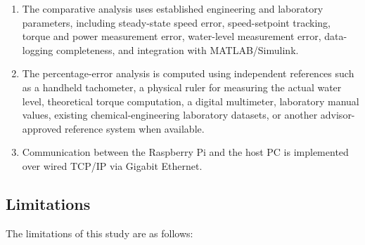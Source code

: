 \begin{enumerate}
    \item The comparative analysis uses established engineering and laboratory parameters, including steady-state speed error, speed-setpoint tracking, torque and power measurement error, water-level measurement error, data-logging completeness, and integration with MATLAB/Simulink.
    \item The percentage-error analysis is computed using independent references such as a handheld tachometer, a physical ruler for measuring the actual water level, theoretical torque computation, a digital multimeter, laboratory manual values, existing chemical-engineering laboratory datasets, or another advisor-approved reference system when available.
    \item Communication between the Raspberry Pi and the host PC is implemented over wired TCP/IP via Gigabit Ethernet.
\end{enumerate}

\subsection{Limitations} %
\label{subsec:limitations}

The limitations of this study are as follows:

